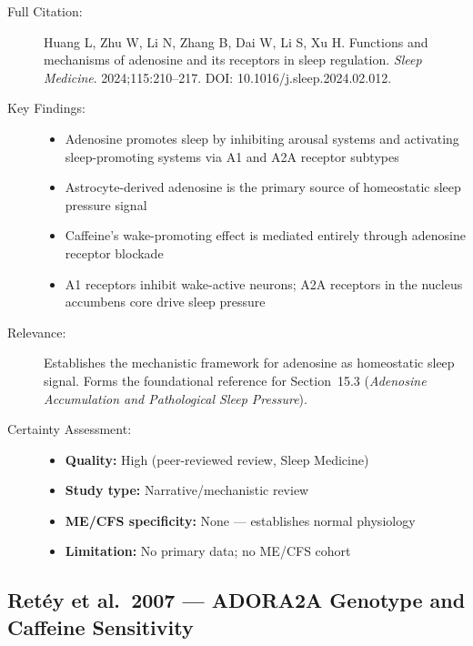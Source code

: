 \begin{description}
    \item[Full Citation:] Huang L, Zhu W, Li N, Zhang B, Dai W, Li S, Xu H\@. Functions and mechanisms of adenosine and its receptors in sleep regulation. \textit{Sleep Medicine}. 2024;115:210--217. DOI: 10.1016/j.sleep.2024.02.012.
    \item[Key Findings:]
    \begin{itemize}
        \item Adenosine promotes sleep by inhibiting arousal systems and activating sleep-promoting systems via A1 and A2A receptor subtypes
        \item Astrocyte-derived adenosine is the primary source of homeostatic sleep pressure signal
        \item Caffeine's wake-promoting effect is mediated entirely through adenosine receptor blockade
        \item A1 receptors inhibit wake-active neurons; A2A receptors in the nucleus accumbens core drive sleep pressure
    \end{itemize}
    \item[Relevance:] Establishes the mechanistic framework for adenosine as homeostatic sleep signal. Forms the foundational reference for Section~15.3 (\textit{Adenosine Accumulation and Pathological Sleep Pressure}).
    \item[Certainty Assessment:]
    \begin{itemize}
        \item \textbf{Quality:} High (peer-reviewed review, Sleep Medicine)
        \item \textbf{Study type:} Narrative/mechanistic review
        \item \textbf{ME/CFS specificity:} None --- establishes normal physiology
        \item \textbf{Limitation:} No primary data; no ME/CFS cohort
    \end{itemize}
\end{description}

\subsection{Ret\'{e}y et al.\ 2007 --- ADORA2A Genotype and Caffeine Sensitivity}

